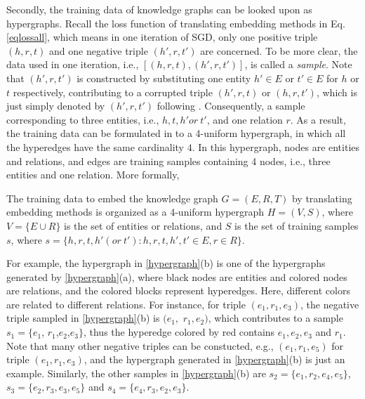 \documentclass[sigconf]{acmart}
\begin{document}
Secondly, the training data of knowledge graphs can be looked upon as hypergraphs. 
Recall the loss function of translating embedding methods in Eq.\eqref{eqlossall}, which means in one iteration of  SGD, only one positive triple $(h,r,t)$ and one negative triple $(h',r,t')$ are concerned. To be more clear, the data used in one iteration, i.e., $\left[(h,r,t), (h',r,t')\right]$, is called a \textit{sample}. Note that $(h',r,t')$ is constructed by substituting one entity $h' \in E$ or $t' \in E$ for $h$ or $t$ respectively, contributing to a corrupted triple $(h',r,t)$ or $(h,r,t')$, which is just simply denoted by $(h',r,t')$ following \cite{bordes2013translating}. Consequently, a sample corresponding to three entities, i.e., $h,t,h' or \ t'$, and one relation $r$. As a result, the training data can be formulated in to a 4-uniform hypergraph, in which all the hyperedges have  the same cardinality $4$. In this hypergraph, nodes are entities and relations, and edges are training samples containing 4 nodes, i.e., three entities and one relation. More formally, 
\begin{definition} 
The training data to embed the knowledge graph $G=(E,R,T)$ by translating embedding methods is organized as a 4-uniform hypergraph $H=(V,S)$, where $V = \{E \cup R\}$ is the set of entities or relations, and $S$ is the set of training samples $s$, where $s=\{h,r,t,h'(or \ t'): h,r,t,h',t' \in E, r \in R\}$.
\end{definition}

For example, the hypergraph in \figurename \ref{hypergraph}(b) is one of the hypergraphs generated by \figurename \ref{hypergraph}(a), where black nodes are entities and colored nodes are relations, and the colored blocks represent hyperedges. Here, different colors are related to different relations. 
For instance, for triple $(e_1, r_1, e_3)$, the negative triple sampled in \figurename \ref{hypergraph}(b)  is $(e_1,$ $ r_1,e_2)$, which contributes to a sample $s_1=\{e_1$, $r_1$,$e_2$,$e_3\}$, thus the hyperedge colored by red contains $e_1,e_2,e_3$ and $r_1$. Note that many other negative triples can be constucted, e.g., $(e_1, r_1,e_5)$ for triple $(e_1, r_1, e_3)$, and the hypergraph generated in  \figurename \ref{hypergraph}(b) is just an example. 
Similarly, the other samples in \figurename \ref{hypergraph}(b) are $s_2=\{e_1,r_2,e_4,e_5\}$, $s_3=\{e_2,r_3,e_3,e_5\}$ and $s_4=\{e_4,r_3,e_2,e_3\}$.
\end{document}
